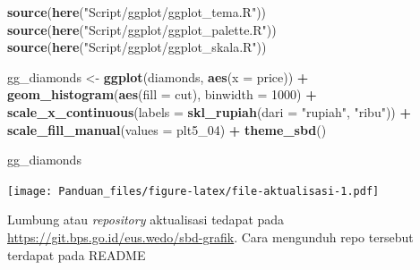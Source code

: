 \documentclass[]{book}
\newenvironment{Shaded}{\begin{snugshade}}{\end{snugshade}}
\newcommand{\KeywordTok}[1]{\textcolor[rgb]{0.13,0.29,0.53}{\textbf{#1}}}
\newcommand{\DataTypeTok}[1]{\textcolor[rgb]{0.13,0.29,0.53}{#1}}
\newcommand{\DecValTok}[1]{\textcolor[rgb]{0.00,0.00,0.81}{#1}}
\newcommand{\StringTok}[1]{\textcolor[rgb]{0.31,0.60,0.02}{#1}}
\newcommand{\OperatorTok}[1]{\textcolor[rgb]{0.81,0.36,0.00}{\textbf{#1}}}
\newcommand{\NormalTok}[1]{#1}
\begin{document}
\begin{Shaded}
\begin{Highlighting}[]
\KeywordTok{source}\NormalTok{(}\KeywordTok{here}\NormalTok{(}\StringTok{"Script/ggplot/ggplot_tema.R"}\NormalTok{))}
\KeywordTok{source}\NormalTok{(}\KeywordTok{here}\NormalTok{(}\StringTok{"Script/ggplot/ggplot_palette.R"}\NormalTok{))}
\KeywordTok{source}\NormalTok{(}\KeywordTok{here}\NormalTok{(}\StringTok{"Script/ggplot/ggplot_skala.R"}\NormalTok{))}

\NormalTok{gg_diamonds <-}\StringTok{ }\KeywordTok{ggplot}\NormalTok{(diamonds, }\KeywordTok{aes}\NormalTok{(}\DataTypeTok{x =}\NormalTok{ price)) }\OperatorTok{+}
\StringTok{  }\KeywordTok{geom_histogram}\NormalTok{(}\KeywordTok{aes}\NormalTok{(}\DataTypeTok{fill =}\NormalTok{ cut), }\DataTypeTok{binwidth =} \DecValTok{1000}\NormalTok{) }\OperatorTok{+}
\StringTok{  }\KeywordTok{scale_x_continuous}\NormalTok{(}\DataTypeTok{labels =} \KeywordTok{skl_rupiah}\NormalTok{(}\DataTypeTok{dari =} \StringTok{"rupiah"}\NormalTok{, }\StringTok{"ribu"}\NormalTok{)) }\OperatorTok{+}
\StringTok{  }\KeywordTok{scale_fill_manual}\NormalTok{(}\DataTypeTok{values =}\NormalTok{ plt5_}\DecValTok{04}\NormalTok{) }\OperatorTok{+}
\StringTok{  }\KeywordTok{theme_sbd}\NormalTok{()}

\NormalTok{gg_diamonds}
\end{Highlighting}
\end{Shaded}

\texttt{[image: Panduan\_files/figure-latex/file-aktualisasi-1.pdf]}

Lumbung atau \emph{repository} aktualisasi tedapat pada
\url{https://git.bps.go.id/eus.wedo/sbd-grafik}. Cara mengunduh repo
tersebut terdapat pada README


\end{document}

